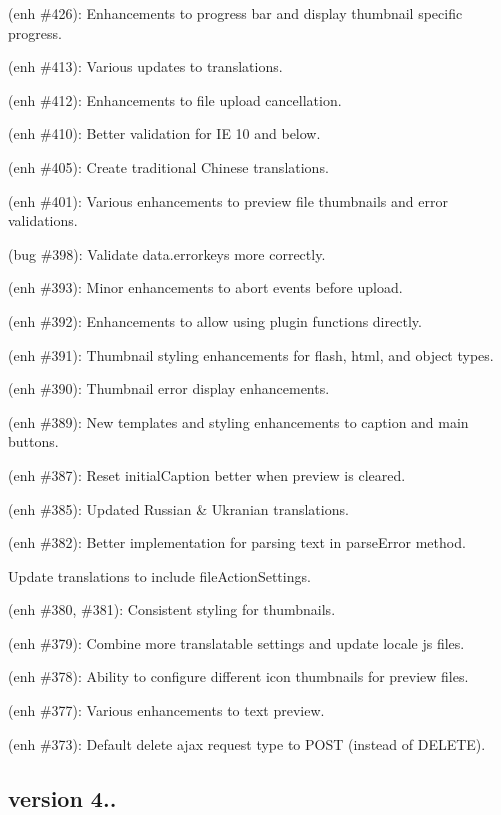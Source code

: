 \begin{DoxyItemize}
\item (enh \#426)\+: Enhancements to progress bar and display thumbnail specific progress.
\item (enh \#413)\+: Various updates to translations.
\item (enh \#412)\+: Enhancements to file upload cancellation.
\item (enh \#410)\+: Better validation for IE 10 and below.
\item (enh \#405)\+: Create traditional Chinese translations.
\item (enh \#401)\+: Various enhancements to preview file thumbnails and error validations.
\item (bug \#398)\+: Validate {\ttfamily data.\+errorkeys} more correctly.
\item (enh \#393)\+: Minor enhancements to abort events before upload.
\item (enh \#392)\+: Enhancements to allow using plugin functions directly.
\item (enh \#391)\+: Thumbnail styling enhancements for flash, html, and object types.
\item (enh \#390)\+: Thumbnail error display enhancements.
\item (enh \#389)\+: New templates and styling enhancements to caption and main buttons.
\item (enh \#387)\+: Reset {\ttfamily initial\+Caption} better when preview is cleared.
\item (enh \#385)\+: Updated Russian \& Ukranian translations.
\item (enh \#382)\+: Better implementation for parsing text in {\ttfamily parse\+Error} method.
\item Update translations to include {\ttfamily file\+Action\+Settings}.
\item (enh \#380, \#381)\+: Consistent styling for thumbnails.
\item (enh \#379)\+: Combine more translatable settings and update locale js files.
\item (enh \#378)\+: Ability to configure different icon thumbnails for preview files.
\item (enh \#377)\+: Various enhancements to text preview.
\item (enh \#373)\+: Default delete ajax request type to P\+O\+ST (instead of D\+E\+L\+E\+TE).
\end{DoxyItemize}

\subsection*{version 4..}

